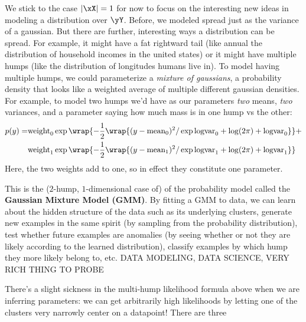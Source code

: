 We stick to the case $|\xX|=1$ for now to focus on the interesting new ideas in
modeling a distribution over $\yY$.  Before, we modeled spread just as the
variance of a gaussian.  But there are further, interesting ways a distribution
can be spread.  For example, it might have a fat rightward tail (like annual
the distribution of household incomes in the united states) or it might have
multiple humps (like the distribution of longitudes humans live in).  To model
having multiple humps, we could parameterize a \emph{mixture of gaussians}, a
probability density that looks like a weighted average of multiple different
gaussian densities.  For example, to model two humps we'd have as our parameters
\emph{two} means, \emph{two} variances, and a parameter saying how much mass
is in one hump vs the other:
\begin{align*}
  p(y) =  
    &\text{weight}_0 \exp\wrap{-\frac{1}{2}\wrap{%
    (y-\text{mean}_0)^2/\exp \text{logvar}_0
    +
    \log(2\pi) + \text{logvar}_0
    }}
    +
    \\&\text{weight}_1 \exp\wrap{-\frac{1}{2}\wrap{%
    (y-\text{mean}_1)^2/\exp \text{logvar}_1
    +
    \log(2\pi) + \text{logvar}_1
    }}
\end{align*}
Here, the two weights add to one, so in effect they constitute one parameter.

This is the ($2$-hump, $1$-dimensional case of) of the probability model called
the \textbf{Gaussian Mixture Model (GMM)}.  By fitting a GMM to data, we can
learn about the hidden structure of the data such as its underlying clusters,
generate new examples in the same spirit (by sampling from the probability
distribution), test whether future examples are anomalies (by seeing whether or
not they are likely according to the learned distribution), classify examples
by which hump they more likely belong to, etc.  DATA MODELING, DATA SCIENCE,
VERY RICH THING TO PROBE



There's a slight sickness in the multi-hump likelihood formula above when we
are inferring parameters: we can get arbitrarily high likelihoods by letting
one of the clusters very narrowly center on a datapoint!
%
There are three

